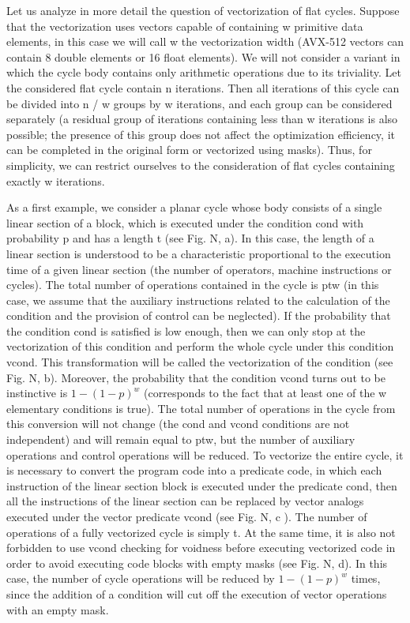 \documentclass[
11pt,%
tightenlines,%
twoside,%
onecolumn,%
nofloats,%
nobibnotes,%
nofootinbib,%
superscriptaddress,%
noshowpacs,%
centertags]%
{revtex4}
\begin{document}
Let us analyze in more detail the question of vectorization of flat cycles. Suppose that the vectorization uses vectors capable of containing w primitive data elements, in this case we will call w the vectorization width (AVX-512 vectors can contain 8 double elements or 16 float elements). We will not consider a variant in which the cycle body contains only arithmetic operations due to its triviality. Let the considered flat cycle contain n iterations. Then all iterations of this cycle can be divided into n / w groups by w iterations, and each group can be considered separately (a residual group of iterations containing less than w iterations is also possible; the presence of this group does not affect the optimization efficiency, it can be completed in the original form or vectorized using masks). Thus, for simplicity, we can restrict ourselves to the consideration of flat cycles containing exactly w iterations.

As a first example, we consider a planar cycle whose body consists of a single linear section of a block, which is executed under the condition cond with probability p and has a length t (see Fig. N, a). In this case, the length of a linear section is understood to be a characteristic proportional to the execution time of a given linear section (the number of operators, machine instructions or cycles). The total number of operations contained in the cycle is ptw (in this case, we assume that the auxiliary instructions related to the calculation of the condition and the provision of control can be neglected). If the probability that the condition cond is satisfied is low enough, then we can only stop at the vectorization of this condition and perform the whole cycle under this condition vcond. This transformation will be called the vectorization of the condition (see Fig. N, b). Moreover, the probability that the condition vcond turns out to be instinctive is $1 - (1 - p) ^ w$ (corresponds to the fact that at least one of the w elementary conditions is true). The total number of operations in the cycle from this conversion will not change (the cond and vcond conditions are not independent) and will remain equal to ptw, but the number of auxiliary operations and control operations will be reduced. To vectorize the entire cycle, it is necessary to convert the program code into a predicate code, in which each instruction of the linear section block is executed under the predicate cond, then all the instructions of the linear section can be replaced by vector analogs executed under the vector predicate vcond (see Fig. N, c ). The number of operations of a fully vectorized cycle is simply t. At the same time, it is also not forbidden to use vcond checking for voidness before executing vectorized code in order to avoid executing code blocks with empty masks (see Fig. N, d). In this case, the number of cycle operations will be reduced by $1 - (1 - p) ^ w$ times, since the addition of a condition will cut off the execution of vector operations with an empty mask.
\end{document}
